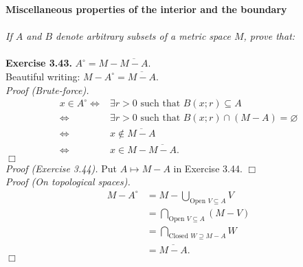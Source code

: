 \documentclass{article}
\begin{document}




\textbf{\large Miscellaneous properties of the interior and the boundary} \\\\

\emph{If $A$ and $B$ denote arbitrary subsets of a metric space $M$, prove that:} \\\\



\textbf{Exercise 3.43.}
\emph{$A^{\circ} = M - \overline{M - A}.$} \\

Beautiful writing: $M - A^{\circ} = \overline{M - A}$. \\

\emph{Proof (Brute-force).}
\begin{align*}
x \in A^{\circ}
\Longleftrightarrow&
\exists r > 0 \text{ such that } B(x;r) \subseteq A \\
\Longleftrightarrow&
\exists r > 0 \text{ such that } B(x;r) \cap (M - A) = \varnothing \\
\Longleftrightarrow&
x \not\in \overline{M - A} \\
\Longleftrightarrow&
x \in M - \overline{M - A}.
\end{align*}
$\Box$ \\

\emph{Proof (Exercise 3.44).}
Put $A \mapsto M-A$ in Exercise 3.44.
$\Box$ \\

\emph{Proof (On topological spaces).}
\begin{align*}
M - A^{\circ}
&= M - \bigcup_{\text{Open } V \subseteq A} V \\
&= \bigcap_{\text{Open } V \subseteq A} (M - V) \\
&= \bigcap_{\text{Closed } W \supseteq M-A} W \\
&= \overline{M - A}.
\end{align*}
$\Box$ \\\\



\end{document}
